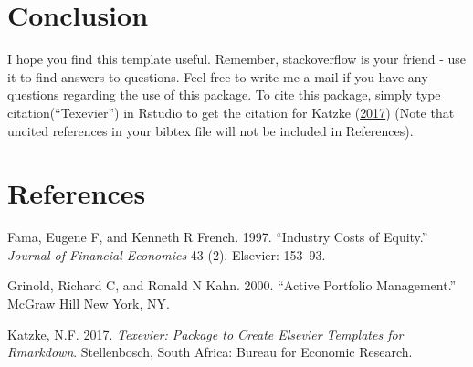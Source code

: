 \documentclass[11pt,preprint, authoryear]{elsarticle}
\numberwithin{equation}{section}
\numberwithin{figure}{section}
\numberwithin{table}{section}
\begin{document}
\section{Conclusion}\label{conclusion}

I hope you find this template useful. Remember, stackoverflow is your
friend - use it to find answers to questions. Feel free to write me a
mail if you have any questions regarding the use of this package. To
cite this package, simply type citation(``Texevier'') in Rstudio to get
the citation for Katzke (\protect\hyperlink{ref-Texevier}{2017}) (Note
that uncited references in your bibtex file will not be included in
References).

\section*{References}\label{references}

\hypertarget{refs}{}
\hypertarget{ref-fama1997}{}
Fama, Eugene F, and Kenneth R French. 1997. ``Industry Costs of
Equity.'' \emph{Journal of Financial Economics} 43 (2). Elsevier:
153--93.

\hypertarget{ref-grinold2000}{}
Grinold, Richard C, and Ronald N Kahn. 2000. ``Active Portfolio
Management.'' McGraw Hill New York, NY.

\hypertarget{ref-Texevier}{}
Katzke, N.F. 2017. \emph{Texevier: Package to Create Elsevier Templates
for Rmarkdown}. Stellenbosch, South Africa: Bureau for Economic
Research.

\newpage
\nocite{*}

\end{document}
